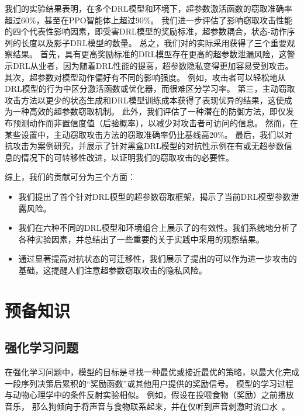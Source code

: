我们的实验结果表明，在多个DRL模型和环境下，超参数激活函数的窃取准确率超过$60\%$，甚至在PPO智能体上超过$90\%$。
我们进一步评估了影响窃取攻击性能的四个代表性影响因素，即受害DRL模型的奖励标准，超参数耦合，状态-动作序列的长度以及影子DRL模型的数量。
总之，我们对\sysname 的实际采用获得了三个重要观察结果。
首先，具有更高奖励标准的DRL模型存在更高的超参数泄漏风险，这警示DRL从业者，因为随着DRL性能的提高，超参数隐私变得更加容易受到攻击。
其次，超参数对模型动作偏好有不同的影响强度。
例如，攻击者可以轻松地从DRL模型的行为中区分激活函数或优化器，而很难区分学习率。
第三，主动窃取攻击方法以更少的状态生成和DRL模型训练成本获得了表现优异的结果，这使\sysname 成为一种高效的超参数窃取机制。
此外，我们评估了一种潜在的防御方法，即仅发布预测动作而非置信度值（后验概率），以减少对攻击者可访问的信息。
然而，在某些设置中，主动窃取攻击方法的窃取准确率仍比基线高$20\%$。
最后，我们以对抗攻击为案例研究，并展示了针对黑盒DRL模型的对抗性示例在有或无超参数信息的情况下的可转移性改进，以证明我们的窃取攻击的必要性。

综上，我们的贡献可分为三个方面：
\begin{itemize}
\item 我们提出了首个针对DRL模型的超参数窃取框架\sysname，揭示了当前DRL模型参数泄露风险。
\item 我们在六种不同的DRL模型和环境组合上展示了\sysname 的有效性。我们系统地分析了各种实验因素，并总结出了一些重要的关于实践中采用\sysname 的观察结果。
\item 通过显著提高对抗状态的可迁移性，我们展示了提出的\sysname 可以作为进一步攻击的基础，这提醒人们注意超参数窃取攻击的隐私风险。
\end{itemize}

\section{预备知识}
\subsection{强化学习问题}
\label{sec:Reinforcement Learning Problem}
在强化学习问题中，模型的目标是寻找一种最优或接近最优的策略，以最大化完成一段序列决策后累积的“奖励函数”或其他用户提供的奖励信号。
模型的学习过程与动物心理学中的条件反射实验相似。
例如，假设在投喂食物（奖励）之前播放音乐，
那么狗倾向于将声音与食物联系起来，并在仅听到声音刺激时流口水~\cite{PG41}。


